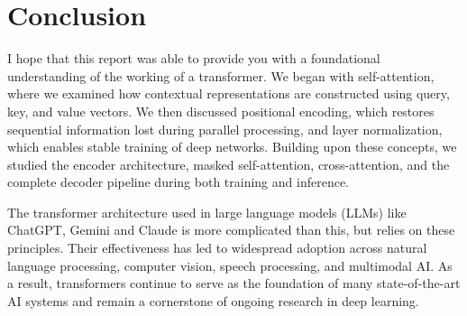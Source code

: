 \chapter{Conclusion}

I hope that this report was able to provide you with a foundational understanding of the working of a transformer. We began with self-attention, where we examined how contextual representations are constructed using query, key, and value vectors. We then discussed positional encoding, which restores sequential information lost during parallel processing, and layer normalization, which enables stable training of deep networks. Building upon these concepts, we studied the encoder architecture, masked self-attention, cross-attention, and the complete decoder pipeline during both training and inference.

The transformer architecture used in large language models (LLMs) like ChatGPT, Gemini and Claude is more complicated than this, but relies on these principles. Their effectiveness has led to widespread adoption across natural language processing, computer vision, speech processing, and multimodal AI. As a result, transformers continue to serve as the foundation of many state-of-the-art AI systems and remain a cornerstone of ongoing research in deep learning.